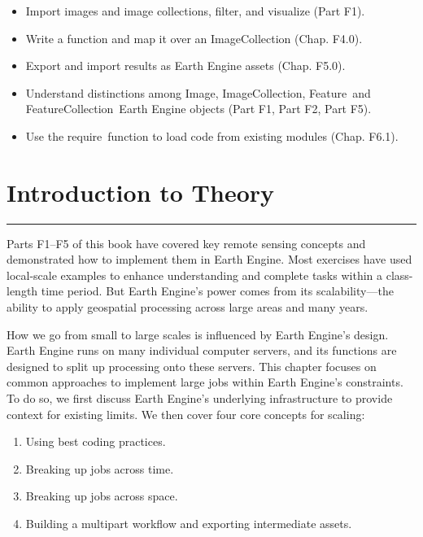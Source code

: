 \documentclass[
  letterpaper,
  DIV=11,
  numbers=noendperiod]{scrreprt}
\providecommand{\tightlist}{%
  \setlength{\itemsep}{0pt}\setlength{\parskip}{0pt}}\usepackage{longtable,booktabs,array}
\begin{document}

\begin{itemize}
\tightlist
\item
  Import images and image collections, filter, and visualize (Part F1).
\item
  Write a function and map it over an ImageCollection (Chap. F4.0).
\item
  Export and import results as Earth Engine assets (Chap. F5.0).
\item
  Understand distinctions among Image, ImageCollection, Feature~and
  FeatureCollection~Earth Engine objects (Part F1, Part F2, Part F5).
\item
  Use the require~function to load code from existing modules (Chap.
  F6.1).
\end{itemize}

\hypertarget{introduction-to-theory-16}{%
\section*{Introduction to Theory}\label{introduction-to-theory-16}}


\begin{center}\rule{0.5\linewidth}{0.5pt}\end{center}

Parts F1--F5 of this book have covered key remote sensing concepts and
demonstrated how to implement them in Earth Engine. Most exercises have
used local-scale examples to enhance understanding and complete tasks
within a class-length time period. But Earth Engine's power comes from
its scalability---the ability to apply geospatial processing across
large areas and many years.

How we go from small to large scales is influenced by Earth Engine's
design. Earth Engine runs on many individual computer servers, and its
functions are designed to split up processing onto these servers. This
chapter focuses on common approaches to implement large jobs within
Earth Engine's constraints. To do so, we first discuss Earth Engine's
underlying infrastructure to provide context for existing limits. We
then cover four core concepts for scaling:

\begin{enumerate}
\def\labelenumi{\arabic{enumi}.}
\tightlist
\item
  Using best coding practices.
\item
  Breaking up jobs across time.
\item
  Breaking up jobs across space.
\item
  Building a multipart workflow and exporting intermediate assets.
\end{enumerate}
\end{document}
